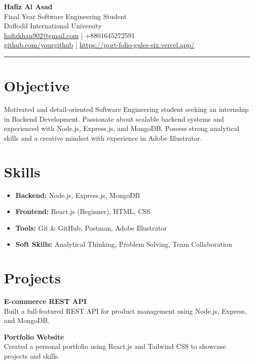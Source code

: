 \documentclass[a4paper,10pt]{article}
\begin{document}
\begin{center}
    {\LARGE \textbf{Hafiz Al Asad}} \\
    Final Year Software Engineering Student \\
    Daffodil International University \\
    \vspace{0.3em}
    \href{mailto:hkkhan074@gmail.com}{hafizkhan902@gmail.com} \quad | \quad +8801645272591 \\
    \href{https://github.com/hafizkhan902}{github.com/yourgithub} \quad | \quad \href{https://port-folio-gules-six.vercel.app/}{https://port-folio-gules-six.vercel.app/}
\end{center}

\hrule
\vspace{1em}

\section*{Objective}
Motivated and detail-oriented Software Engineering student seeking an internship in Backend Development. Passionate about scalable backend systems and experienced with Node.js, Express.js, and MongoDB. Possess strong analytical skills and a creative mindset with experience in Adobe Illustrator.

\section*{Skills}
\begin{itemize}[noitemsep, topsep=0pt]
    \item \textbf{Backend:} Node.js, Express.js, MongoDB
    \item \textbf{Frontend:} React.js (Beginner), HTML, CSS
    \item \textbf{Tools:} Git \& GitHub, Postman, Adobe Illustrator
    \item \textbf{Soft Skills:} Analytical Thinking, Problem Solving, Team Collaboration
\end{itemize}

\section*{Projects}
\textbf{E-commerce REST API} \\
Built a full-featured REST API for product management using Node.js, Express, and MongoDB.

\textbf{Portfolio Website} \\
Created a personal portfolio using React.js and Tailwind CSS to showcase projects and skills.
\end{document}

